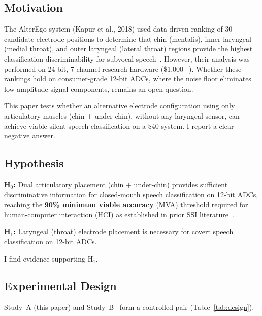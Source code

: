 \documentclass[11pt, a4paper]{article}
\begin{document}
\subsection{Motivation}

The AlterEgo system (Kapur et al., 2018) used data-driven ranking of 30 candidate electrode positions to determine that chin (mentalis), inner laryngeal (medial throat), and outer laryngeal (lateral throat) regions provide the highest classification discriminability for subvocal speech~\cite{kapur2018}. However, their analysis was performed on 24-bit, 7-channel research hardware (\$1{,}000+). Whether these rankings hold on consumer-grade 12-bit ADCs, where the noise floor eliminates low-amplitude signal components, remains an open question.

This paper tests whether an alternative electrode configuration using only articulatory muscles (chin + under-chin), without any laryngeal sensor, can achieve viable silent speech classification on a \$40 system. I report a clear negative answer.

\subsection{Hypothesis}

\noindent\textbf{H$_0$:} Dual articulatory placement (chin + under-chin) provides sufficient discriminative information for closed-mouth speech classification on 12-bit ADCs, reaching the \textbf{90\% minimum viable accuracy} (MVA) threshold required for human-computer interaction (HCI) as established in prior SSI literature~\cite{kapur2018}.

\noindent\textbf{H$_1$:} Laryngeal (throat) electrode placement is necessary for covert speech classification on 12-bit ADCs.

I find evidence supporting H$_1$.

\subsection{Experimental Design}

Study~A (this paper) and Study~B~\cite{kho2026companion} form a controlled pair (Table~\ref{tab:design}).
\end{document}
